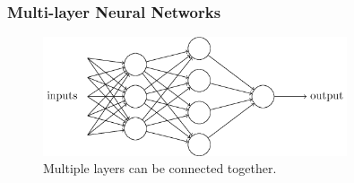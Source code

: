 \documentclass{beamer}
\begin{document}
\begin{frame}
\frametitle{Multi-layer Neural Networks} 

\begin{figure}[!h]
\begin{center}
\includegraphics[width=0.8\textwidth]{figures/tikz1.png}
\end{center}
\caption{Multiple layers can be connected together.}
\end{figure}


\end{frame}
\end{document}
